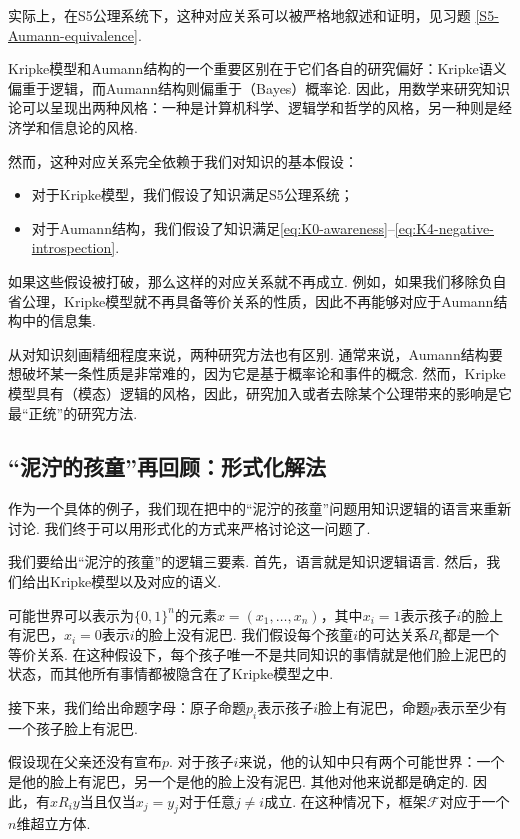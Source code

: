 实际上，在S5公理系统下，这种对应关系可以被严格地叙述和证明，见习题 \ref{S5-Aumann-equivalence}.

Kripke模型和Aumann结构的一个重要区别在于它们各自的研究偏好：Kripke语义偏重于逻辑，而Aumann结构则偏重于（Bayes）概率论. 因此，用数学来研究知识论可以呈现出两种风格：一种是计算机科学、逻辑学和哲学的风格，另一种则是经济学和信息论的风格. 

然而，这种对应关系完全依赖于我们对知识的基本假设：
\begin{itemize}
    \item 对于Kripke模型，我们假设了知识满足S5公理系统；
    \item 对于Aumann结构，我们假设了知识满足\eqref{eq:K0-awareness}--\eqref{eq:K4-negative-introspection}. 
\end{itemize}
如果这些假设被打破，那么这样的对应关系就不再成立. 例如，如果我们移除负自省公理，Kripke模型就不再具备等价关系的性质，因此不再能够对应于Aumann结构中的信息集. 

从对知识刻画精细程度来说，两种研究方法也有区别. 通常来说，Aumann结构要想破坏某一条性质是非常难的，因为它是基于概率论和事件的概念. 然而，Kripke模型具有（模态）逻辑的风格，因此，研究加入或者去除某个公理带来的影响是它最“正统”的研究方法. 


\subsection{“泥泞的孩童”再回顾：形式化解法}

作为一个具体的例子，我们现在把中的“泥泞的孩童”问题用知识逻辑的语言来重新讨论. 我们终于可以用形式化的方式来严格讨论这一问题了. 

我们要给出“泥泞的孩童”的逻辑三要素. 首先，语言就是知识逻辑语言. 然后，我们给出Kripke模型以及对应的语义. 

可能世界可以表示为$\{0,1\}^n$的元素$x=(x_1,\dots,x_n)$，其中$x_i=1$表示孩子$i$的脸上有泥巴，$x_i=0$表示$i$的脸上没有泥巴. 我们假设每个孩童$i$的可达关系$R_i$都是一个等价关系. 在这种假设下，每个孩子唯一不是共同知识的事情就是他们脸上泥巴的状态，而其他所有事情都被隐含在了Kripke模型之中. 

接下来，我们给出命题字母：原子命题$p_i$表示孩子$i$脸上有泥巴，命题$p$表示至少有一个孩子脸上有泥巴. 

假设现在父亲还没有宣布$p$. 对于孩子$i$来说，他的认知中只有两个可能世界：一个是他的脸上有泥巴，另一个是他的脸上没有泥巴. 其他对他来说都是确定的. 因此，有$x R_i y$当且仅当$x_j=y_j$对于任意$j\neq i$成立. 在这种情况下，框架$\mathcal{F}$对应于一个$n$维超立方体. 

